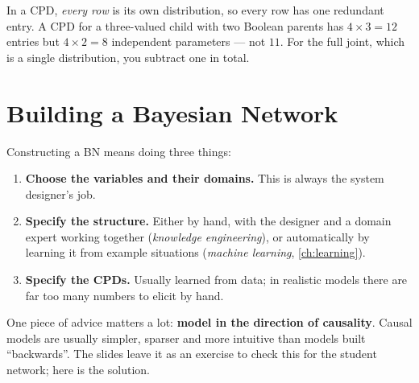 \documentclass[11pt, oneside]{book}
\let\originalsection\section
\renewcommand{\section}{\Needspace{7\baselineskip}\originalsection}
\begin{document}
\begin{notebox}[title={Subtract one per row, not one per table}, unbreakable]
In a CPD, \emph{every row} is its own distribution, so every row has one
redundant entry. A CPD for a three-valued child with two Boolean parents has
$4 \times 3 = 12$ entries but $4 \times 2 = 8$ independent parameters --- not
$11$. For the full joint, which is a single distribution, you subtract one in
total.
\end{notebox}

\section{Building a Bayesian Network}
\label{sec:building}

Constructing a BN means doing three things:
\begin{enumerate}
  \item \textbf{Choose the variables and their domains.} This is always the
    system designer's job.
  \item \textbf{Specify the structure.} Either by hand, with the designer and a
    domain expert working together (\emph{knowledge engineering}), or
    automatically by learning it from example situations (\emph{machine
    learning}, \cref{ch:learning}).
  \item \textbf{Specify the CPDs.} Usually learned from data; in realistic
    models there are far too many numbers to elicit by hand.
\end{enumerate}

One piece of advice matters a lot: \textbf{model in the direction of
causality}. Causal models are usually simpler, sparser and more intuitive than
models built ``backwards''. The slides leave it as an exercise to check this
for the student network; here is the solution.
\end{document}
